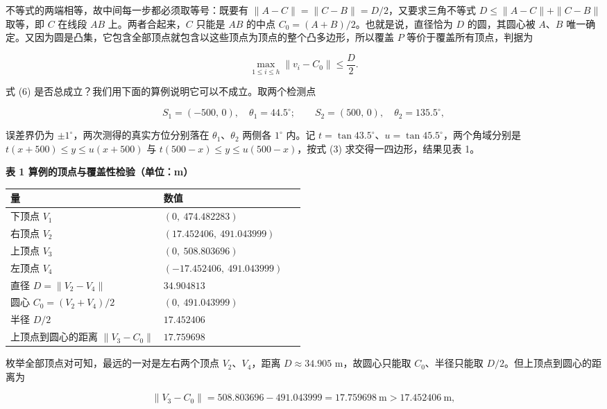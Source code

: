 \documentclass[UTF8,a4paper,zihao=-4,fontset=fandol]{ctexart}
\begin{document}
不等式的两端相等，故中间每一步都必须取等号：既要有 $\|A-C\|=\|C-B\|=D/2$，又要求三角不等式 $D\le\|A-C\|+\|C-B\|$ 取等，即 $C$ 在线段 $AB$ 上。两者合起来，$C$ 只能是 $AB$ 的中点 $C_0=(A+B)/2$。也就是说，直径恰为 $D$ 的圆，其圆心被 $A$、$B$ 唯一确定。又因为圆是凸集，它包含全部顶点就包含以这些顶点为顶点的整个凸多边形，所以覆盖 $P$ 等价于覆盖所有顶点，判据为

\[
\max_{1\le i\le h}\|v_i-C_0\|\le\frac D2 . \tag{6}
\]

式 (6) 是否总成立？我们用下面的算例说明它可以不成立。取两个检测点

\[
S_1=(-500,\,0),\quad\theta_1=44.5^\circ;\qquad
S_2=(500,\,0),\quad\theta_2=135.5^\circ,
\]

误差界仍为 $\pm1^\circ$，两次测得的真实方位分别落在 $\theta_1$、$\theta_2$ 两侧各 $1^\circ$ 内。记 $t=\tan43.5^\circ$、$u=\tan45.5^\circ$，两个角域分别是 $t(x+500)\le y\le u(x+500)$ 与 $t(500-x)\le y\le u(500-x)$，按式 (3) 求交得一四边形，结果见表 1。

\begin{center}
\textbf{表 1 算例的顶点与覆盖性检验（单位：m）}
\end{center}

\begin{center}
\renewcommand{\arraystretch}{1.3}
\begin{tabularx}{0.98\linewidth}{>{\raggedright\arraybackslash}p{0.52\linewidth}X}
\toprule
\textbf{量} & \textbf{数值} \\
\midrule
下顶点 $V_1$ & $(0,\ 474.482283)$ \\
右顶点 $V_2$ & $(17.452406,\ 491.043999)$ \\
上顶点 $V_3$ & $(0,\ 508.803696)$ \\
左顶点 $V_4$ & $(-17.452406,\ 491.043999)$ \\
直径 $D=\|V_2-V_4\|$ & $34.904813$ \\
圆心 $C_0=(V_2+V_4)/2$ & $(0,\ 491.043999)$ \\
半径 $D/2$ & $17.452406$ \\
上顶点到圆心的距离 $\|V_3-C_0\|$ & $\boldsymbol{17.759698}$ \\
\bottomrule
\end{tabularx}
\end{center}

枚举全部顶点对可知，最远的一对是左右两个顶点 $V_2$、$V_4$，距离 $D\approx34.905$ m，故圆心只能取 $C_0$、半径只能取 $D/2$。但上顶点到圆心的距离为

\[
\|V_3-C_0\|=508.803696-491.043999=17.759698\ \text{m}>17.452406\ \text{m},
\]
\end{document}
